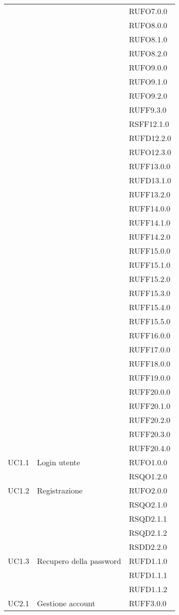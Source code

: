 \begin{center}
\begin{longtable}{lp{}l}
 &  & RUFO7.0.0 \\
 &  & RUFO8.0.0 \\
 &  & RUFO8.1.0 \\
 &  & RUFO8.2.0 \\
 &  & RUFO9.0.0 \\
 &  & RUFO9.1.0 \\
 &  & RUFO9.2.0 \\
 &  & RUFF9.3.0 \\
 &  & RSFF12.1.0 \\
 &  & RUFD12.2.0 \\
 &  & RUFO12.3.0 \\
 &  & RUFF13.0.0 \\
 &  & RUFD13.1.0 \\
 &  & RUFF13.2.0 \\
 &  & RUFF14.0.0 \\
 &  & RUFF14.1.0 \\
 &  & RUFF14.2.0 \\
 &  & RUFF15.0.0 \\
 &  & RUFF15.1.0 \\
 &  & RUFF15.2.0 \\
 &  & RUFF15.3.0 \\
 &  & RUFF15.4.0 \\
 &  & RUFF15.5.0 \\
 &  & RUFF16.0.0 \\
 &  & RUFF17.0.0 \\
 &  & RUFF18.0.0 \\
 &  & RUFF19.0.0 \\
 &  & RUFF20.0.0 \\
 &  & RUFF20.1.0 \\
 &  & RUFF20.2.0 \\
 &  & RUFF20.3.0 \\
 &  & RUFF20.4.0 \\
UC1.1 & Login utente & RUFO1.0.0 \\
 &  & RSQO1.2.0 \\
UC1.2 & Registrazione & RUFO2.0.0 \\
 &  & RSQO2.1.0 \\
 &  & RSQD2.1.1 \\
 &  & RSQD2.1.2 \\
 &  & RSDD2.2.0 \\
UC1.3 & Recupero della password & RUFD1.1.0 \\
 &  & RUFD1.1.1 \\
 &  & RUFD1.1.2 \\
UC2.1 & Gestione account & RUFF3.0.0 \\

\end{longtable}
\end{center}
